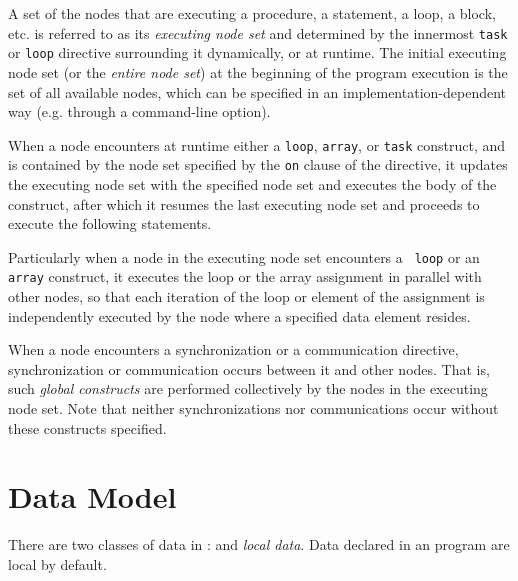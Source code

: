 


A set of the nodes that are executing a procedure, a statement, a loop,
a block, etc. is referred to as its {\it executing node set} and
determined by the innermost {\tt task} or {\tt loop} directive
surrounding it dynamically, or at runtime.
%
The initial executing node set (or the {\it entire node set}) at the
beginning of the program execution is the set of all available nodes,
which can be specified in an implementation-dependent way (e.g. through
a command-line option).

When a node encounters at runtime either a {\tt loop}, {\tt array}, or
{\tt task} construct, and is contained by the node set specified by the
{\tt on} clause of the directive, it updates the executing node set with
the specified node set and executes the body of the construct, after
which it resumes the last executing node set and proceeds to execute the
following statements.

Particularly when a node in the executing node set encounters a {\tt
loop} or an {\tt array} construct, it executes the loop or the array
assignment in parallel with other nodes, so that each iteration of the
loop or element of the assignment is independently executed by the node
where a specified data element resides.

When a node encounters a synchronization or a communication directive,
synchronization or communication occurs between it and other nodes.
%
That is, such {\it global constructs} are performed collectively by the
nodes in the executing node set.
%
Note that neither synchronizations nor communications occur without these
constructs specified.


\section{Data Model}


There are two classes of data in {\XMP}: {\it {}} and
{\it local data}. Data declared in an {\XMP} program are local by
default.

